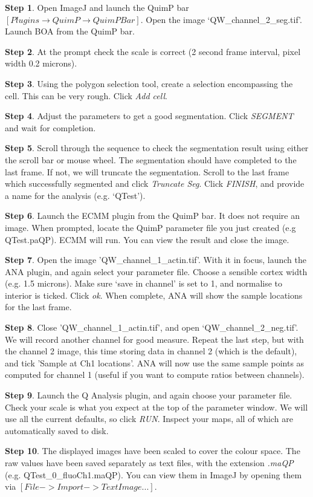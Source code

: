 \documentclass[a4paper,12pt]{article}
\begin{document}
\textbf{Step 1}. Open ImageJ and launch the QuimP bar $[Plugins\rightarrow QuimP\rightarrow QuimP Bar]$.  Open the image `QW\_channel\_2\_seg.tif'.  Launch BOA from the QuimP bar.

\textbf{Step 2}. At the prompt check the scale is correct (2 second frame interval, pixel width 0.2 microns).

\textbf{Step 3}. Using the polygon selection tool, create a selection encompassing the cell. This can be very rough.
Click \emph{Add cell}.

\textbf{Step 4}.  Adjust the parameters to get a good segmentation.  Click \emph{SEGMENT} and wait for completion.

\textbf{Step 5}. Scroll through the sequence to check the segmentation result using either the scroll bar or mouse
wheel. The segmentation should have completed to the last frame.  If not, we will truncate the segmentation.
Scroll to the last frame which successfully segmented and click \emph{Truncate Seg}.
Click \emph{FINISH}, and provide a name for the analysis (e.g. `QTest').

\textbf{Step 6}. Launch the ECMM plugin from the QuimP bar. It does not require an image. When prompted,
locate the QuimP parameter file you just created (e.g QTest.paQP).  ECMM will run.
You can view the result and close the image.

\textbf{Step 7}. Open the image 'QW\_channel\_1\_actin.tif'.  With it in focus, launch the ANA plugin,
and again select your parameter file.  Choose a sensible cortex width (e.g. 1.5 microns).
Make sure `save in channel' is set to 1, and normalise to interior is ticked.  Click \emph{ok}.
When complete, ANA will show the sample locations for the last frame.

\textbf{Step 8}. Close 'QW\_channel\_1\_actin.tif', and open `QW\_channel\_2\_neg.tif'.  We will record another
channel for good measure.  Repeat the last step, but with the channel 2 image, this time storing
data in channel 2 (which is the default), and tick 'Sample at Ch1 locations'.  ANA will now
use the same sample points as computed for channel 1 (useful if you want to compute ratios between channels).

\textbf{Step 9}. Launch the Q Analysis plugin, and again choose your parameter file. Check your scale is what you expect at the top of the parameter window. We will use all the
current defaults, so click \emph{RUN}.  Inspect your maps, all of which are automatically saved to disk.

\textbf{Step 10}. The displayed images have been scaled to cover the colour space. The raw values have been saved
separately as text files, with the extension \emph{.maQP} (e.g.  QTest\_0\_fluoCh1.maQP).
You can view them in ImageJ by opening them via $[File -> Import -> Text Image...]$.
\end{document}
